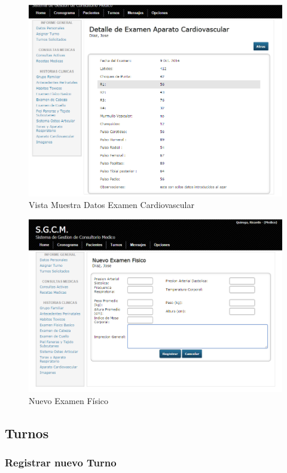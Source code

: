\begin{figure}[H]
    \centering
    \includegraphics[scale=0.5]{resourse/detalle-cardio.png}
    \caption{Vista Muestra Datos Examen Cardiovascular}
    \label{fig:620}
\end{figure}

\begin{figure}[H]
    \centering
    \includegraphics[scale=0.5]{resourse/nuevo-fisico.png}
    \caption{Nuevo Examen Físico}
    \label{fig:621}
\end{figure}


\subsection{Turnos}

\subsubsection{Registrar nuevo Turno}


